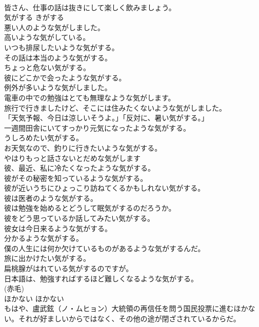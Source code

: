 \documentclass[8pt]{extreport}
\begin{document}
\begin{CJK}{UTF8}{min}
\\	皆さん、仕事の話は抜きにして楽しく飲みましょう。  
\\	気がする	きがする	
\\	悪い人のような気がしました。  
\\	高いような気がしている。  
\\	いつも排尿したいような気がする。  
\\	その話は本当のような気がする。  
\\	ちょっと危ない気がする。  
\\	彼にどこかで会ったような気がする。  
\\	例外が多いような気がしました。  
\\	電車の中での勉強はとても無理なような気がします。   
\\	旅行で行きましたけど、そこには住みたくないような気がしました。  
\\	「天気予報、今日は涼しいそうよ。」「反対に、暑い気がする。」  
\\	一週間田舎にいてすっかり元気になったような気がする。  
\\	うしろめたい気がする。   
\\	お天気なので、釣りに行きたいような気がする。   
\\	やはりもっと話さないとだめな気がします  
\\	彼、最近、私に冷たくなったような気がする。   
\\	彼がその秘密を知っているような気がする。   
\\	彼が近いうちにひょっこり訪ねてくるかもしれない気がする。   
\\	彼は医者のような気がする。   
\\	彼は勉強を始めるとどうして眠気がするのだろうか。  
\\	彼をどう思っているか話してみたい気がする。   
\\	彼女は今日来るような気がする。   
\\	分かるような気がする。   
\\	僕の人生には何か欠けているものがあるような気がするんだ。   
\\	旅に出かけたい気がする。   
\\	扁桃腺がはれている気がするのですが。   
\\	日本語は、勉強すればするほど難しくなるような気がする。  
\\	(赤毛)
\\	ほかない	ほかない	
\\	もはや、盧武鉉（ノ・ムヒョン）大統領の再信任を問う国民投票に進むほかない。それが好ましいからではなく、その他の途が閉ざされているからだ。  

\end{CJK}
\end{document}
